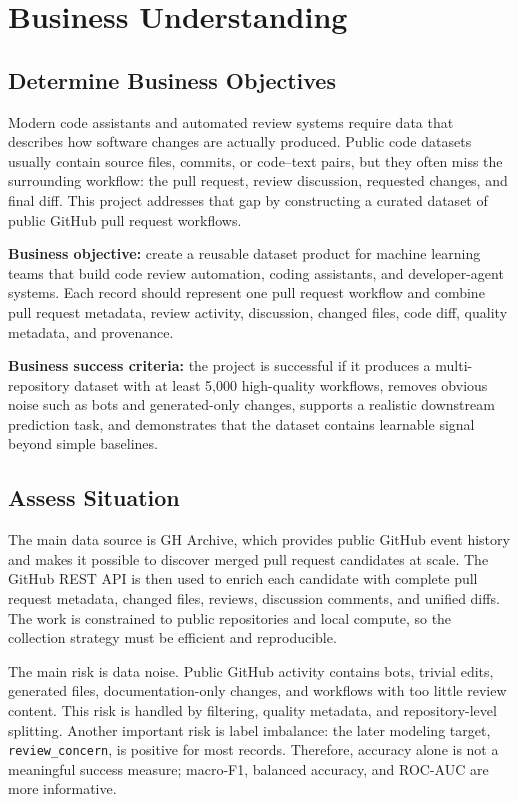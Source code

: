 \section{Business Understanding}

\subsection{Determine Business Objectives}

Modern code assistants and automated review systems require data that describes how software changes are actually produced. Public code datasets usually contain source files, commits, or code--text pairs, but they often miss the surrounding workflow: the pull request, review discussion, requested changes, and final diff. This project addresses that gap by constructing a curated dataset of public GitHub pull request workflows.

\textbf{Business objective:} create a reusable dataset product for machine learning teams that build code review automation, coding assistants, and developer-agent systems. Each record should represent one pull request workflow and combine pull request metadata, review activity, discussion, changed files, code diff, quality metadata, and provenance.

\textbf{Business success criteria:} the project is successful if it produces a multi-repository dataset with at least 5,000 high-quality workflows, removes obvious noise such as bots and generated-only changes, supports a realistic downstream prediction task, and demonstrates that the dataset contains learnable signal beyond simple baselines.

\subsection{Assess Situation}

The main data source is GH Archive, which provides public GitHub event history and makes it possible to discover merged pull request candidates at scale. The GitHub REST API is then used to enrich each candidate with complete pull request metadata, changed files, reviews, discussion comments, and unified diffs. The work is constrained to public repositories and local compute, so the collection strategy must be efficient and reproducible.

The main risk is data noise. Public GitHub activity contains bots, trivial edits, generated files, documentation-only changes, and workflows with too little review content. This risk is handled by filtering, quality metadata, and repository-level splitting. Another important risk is label imbalance: the later modeling target, \texttt{review\_concern}, is positive for most records. Therefore, accuracy alone is not a meaningful success measure; macro-F1, balanced accuracy, and ROC-AUC are more informative.

